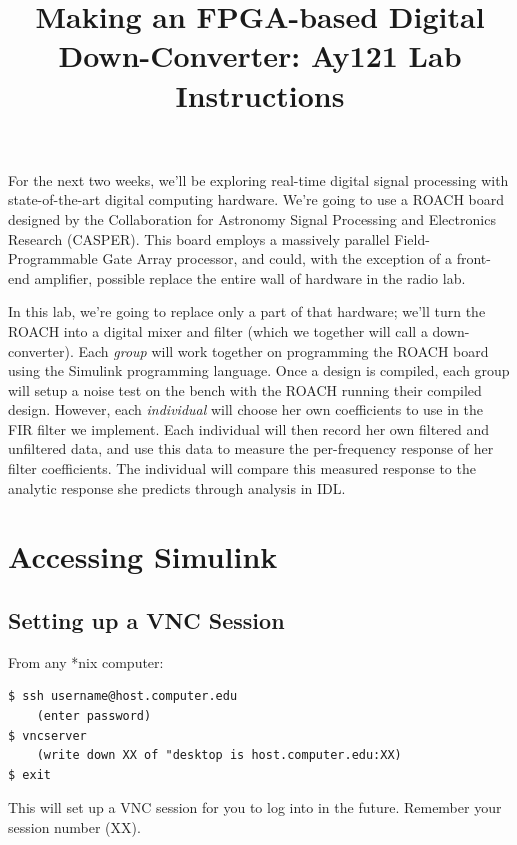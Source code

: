\documentclass[11pt]{article}
\begin{document}
\title{Making an FPGA-based Digital Down-Converter: Ay121 Lab Instructions}

\maketitle

For the next two weeks, we'll be exploring real-time digital signal 
processing with state-of-the-art digital computing hardware.  We're going
to use a ROACH board designed by the Collaboration for Astronomy Signal
Processing and Electronics Research (CASPER).  This board employs a
massively parallel Field-Programmable Gate Array processor, and could,
with the exception of a front-end amplifier, possible replace the entire
wall of hardware in the radio lab.  

In this lab, we're going to replace only a part of that hardware; we'll
turn the ROACH into a digital mixer and filter (which we together will
call a down-converter).  Each {\it group} will work together on programming
the ROACH board using the Simulink programming language.  Once a design
is compiled, each group will setup a noise test on the bench with the ROACH
running their compiled design.  However, each {\it individual} will choose
her own coefficients to use in the FIR filter we implement.  Each individual
will then record her own filtered and unfiltered data, and use this data
to measure the per-frequency response of her filter coefficients.  The individual
will compare this measured response to the analytic response she predicts through
analysis in IDL.

\section{Accessing Simulink}

\subsection{Setting up a VNC Session}

From any *nix computer:
\begin{verbatim}
$ ssh username@host.computer.edu
    (enter password)
$ vncserver
    (write down XX of "desktop is host.computer.edu:XX)
$ exit
\end{verbatim}
This will set up a VNC session for you to log into in the future.  Remember
your session number (XX).
\end{document}
